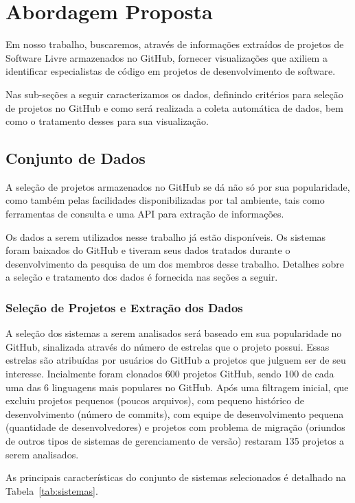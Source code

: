 \documentclass[12pt]{article}
\begin{document}
\section{Abordagem Proposta}
Em nosso trabalho, buscaremos, através de informações extraídos de projetos de Software Livre armazenados no GitHub, fornecer visualizações que axiliem a identificar especialistas de código em projetos de desenvolvimento de software. 

Nas sub-seções a seguir caracterizamos os dados, definindo critérios para seleção de projetos no GitHub e como será realizada a coleta automática de dados, bem como o tratamento desses para sua visualização.

\subsection{Conjunto de Dados}
A seleção de projetos armazenados no GitHub se dá não só por sua popularidade, como também pelas facilidades disponibilizadas por tal ambiente, tais como ferramentas de consulta e uma API para extração de informações.

Os dados a serem utilizados nesse trabalho já estão disponíveis. Os sistemas foram baixados do GitHub e tiveram seus dados tratados durante o desenvolvimento da pesquisa de um dos membros desse trabalho. Detalhes sobre a seleção e tratamento dos dados é fornecida nas seções a seguir. 

\subsubsection {Seleção de Projetos e Extração dos Dados}
A seleção dos sistemas a serem analisados será baseado em sua popularidade no GitHub, sinalizada através do número de estrelas que o projeto possui. Essas estrelas são atribuídas por usuários do GitHub a projetos que julguem ser de seu interesse. Incialmente foram clonados 600 projetos GitHub, sendo 100 de cada uma das 6 linguagens mais populares no GitHub. Após uma filtragem inicial, que excluiu projetos pequenos (poucos arquivos),  com pequeno histórico de desenvolvimento (número de commits), com equipe de desenvolvimento pequena (quantidade de desenvolvedores) e projetos com problema de migração (oriundos de outros tipos de sistemas de gerenciamento de versão) restaram 135 projetos a serem analisados.

As principais características do  conjunto de sistemas selecionados é detalhado na Tabela~\ref{tab:sistemas}.
\end{document}
